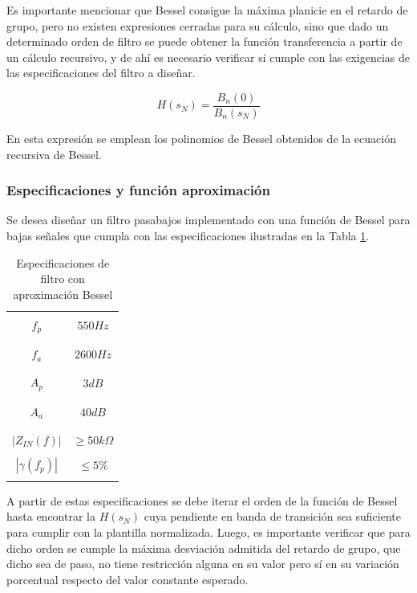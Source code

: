 Es importante mencionar que Bessel consigue la m\'axima planicie en el retardo de grupo, pero no existen expresiones cerradas para su c\'alculo, sino que dado un determinado orden de filtro se puede obtener la funci\'on transferencia
a partir de un c\'alculo recursivo, y de ah\'i es necesario verificar si cumple con las exigencias de las especificaciones del filtro a dise\~nar.

\begin{equation}
H(s_N) = \frac{B_n(0)}{B_n(s_N)}
\end{equation}

En esta expresi\'on se emplean los polinomios de Bessel obtenidos de la ecuaci\'on recursiva de Bessel.

\subsubsection{Especificaciones y funci\'on aproximaci\'on}
Se desea dise\~nar un filtro pasabajos implementado con una funci\'on de Bessel para bajas se\~nales que cumpla con las especificaciones ilustradas
en la Tabla \ref{table:especificaciones_bessel}.

\begin{table}[H]
	\centering
	\begin{tabular}{c | c}
		\hline \\
		$f_p$ & $550Hz$ \\
		\\ \hline \\
		$f_a$ & $2600Hz$ \\
		\\ \hline \\
		$A_p$ & $3 dB$ \\
		\\ \hline \\
		$A_a$ & $40 dB$ \\
		\\ \hline \\
		$|Z_{IN}(f)|$ & $\geq 50k \Omega$ \\ 
		\\ \hline
		$|\gamma(f_p)|$ & $\leq 5 \% $ \\ 
		\\ \hline
	\end{tabular}
	\caption{Especificaciones de filtro con aproximaci\'on Bessel}
	\label{table:especificaciones_bessel}
\end{table}

A partir de estas especificaciones se debe iterar el orden de la funci\'on de Bessel hasta encontrar la $H(s_N)$ cuya pendiente en banda de transici\'on sea suficiente para cumplir con la plantilla
normalizada. Luego, es importante verificar que para dicho orden se cumple la m\'axima desviaci\'on admitida del retardo de grupo, que dicho sea de paso, no tiene restricci\'on alguna en su valor pero s\'i
en su variaci\'on porcentual respecto del valor constante esperado.


